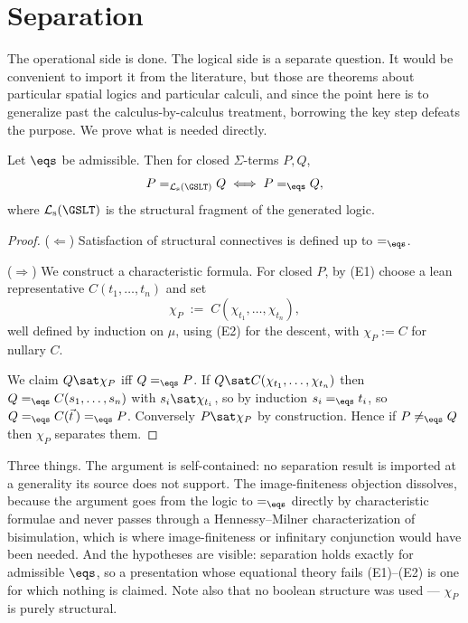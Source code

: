 \section{Separation}
\label{ox:sec:sep}

The operational side is done. The logical side is a separate question. It would be
convenient to import it from the literature, but those are theorems about
particular spatial logics and particular calculi, and since the point here is to
generalize past the calculus-by-calculus treatment, borrowing the key step defeats
the purpose. We prove what is needed directly.

\begin{theorem}
\label{ox:thm:sep}
Let $\eqs$ be admissible. Then for closed $\Sigma$-terms $P,Q$,
\[
  P =_{\mathcal{L}_{\mathrm{s}}(\GSLT)} Q \iff P =_{\eqs} Q ,
\]
where $\mathcal{L}_{\mathrm{s}}(\GSLT)$ is the structural fragment of the
generated logic.
\end{theorem}

\begin{proof}
($\Leftarrow$) Satisfaction of structural connectives is defined up to $=_{\eqs}$.

($\Rightarrow$) We construct a characteristic formula. For closed $P$, by (E1)
choose a lean representative $C(t_1,\dots,t_n)$ and set
\[
  \chi_P \;:=\; C(\chi_{t_1},\dots,\chi_{t_n}),
\]
well defined by induction on $\mu$, using (E2) for the descent, with
$\chi_P := C$ for nullary $C$.

We claim $Q \sat \chi_P$ iff $Q =_{\eqs} P$. If
$Q \sat C(\chi_{t_1},\dots,\chi_{t_n})$ then $Q =_{\eqs} C(s_1,\dots,s_n)$ with
$s_i \sat \chi_{t_i}$, so by induction $s_i =_{\eqs} t_i$, so
$Q =_{\eqs} C(\vec t\,) =_{\eqs} P$. Conversely $P \sat \chi_P$ by construction.
Hence if $P \neq_{\eqs} Q$ then $\chi_P$ separates them.
\end{proof}

\begin{remark}
\label{ox:rem:buys}
Three things. The argument is self-contained: no separation result is imported at
a generality its source does not support. The image-finiteness objection dissolves,
because the argument goes from the logic to $=_{\eqs}$ directly by characteristic
formulae and never passes through a Hennessy--Milner characterization of
bisimulation, which is where image-finiteness or infinitary conjunction would have
been needed. And the hypotheses are visible: separation holds exactly for
admissible $\eqs$, so a presentation whose equational theory fails (E1)--(E2) is one
for which nothing is claimed. Note also that no boolean structure was used ---
$\chi_P$ is purely structural.
\end{remark}

